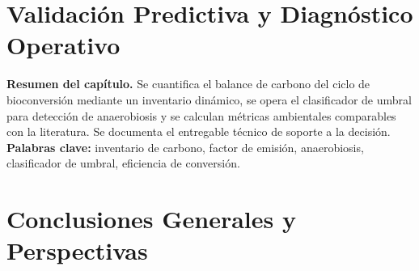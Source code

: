 \documentclass[10pt,spanish,fleqn,openany,twoside,letterpaper]{book}
\begin{document}



 
 
 
 
 
 
\chapter{Validación Predictiva y Diagnóstico Operativo}
\label{chap:cap5}

\begin{center}
\small
\textbf{Resumen del capítulo.}
Se cuantifica el balance de carbono del ciclo de bioconversión mediante un inventario dinámico, se opera el clasificador de umbral para detección de anaerobiosis y se calculan métricas ambientales comparables con la literatura. Se documenta el entregable técnico de soporte a la decisión.
\textbf{Palabras clave:} inventario de carbono, factor de emisión, anaerobiosis, clasificador de umbral, eficiencia de conversión.
\end{center}

% 
% 
% 
% 
% 
% 
% 
% 
\chapter{Conclusiones Generales y Perspectivas}
\label{chap:cap6}

% 
% 
% 
\appendix
\renewcommand{\chaptername}{Anexo}
\end{document}
